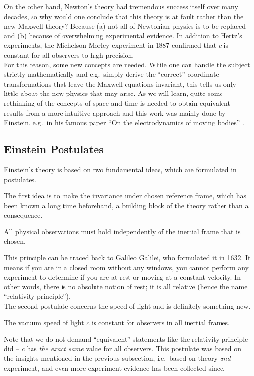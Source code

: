 On the other hand, Newton's theory had tremendous success itself over many decades, so why would one conclude that this theory is at fault rather than the new Maxwell theory? Because (a) not all of Newtonian physics is to be replaced and (b) because of overwhelming experimental evidence. In addition to Hertz's experiments, the Michelson-Morley experiment in 1887 confirmed that $c$ is constant for all observers to high precision.\\


For this reason, some new concepts are needed. While one can handle the subject strictly mathematically and e.g.~simply derive the \enquote{correct} coordinate transformations that leave the Maxwell equations invariant, this tells us only little about the new physics that may arise. As we will learn, quite some rethinking of the concepts of space and time is needed to obtain equivalent results from a more intuitive approach and this work was mainly done by Einstein, e.g.~in his famous paper \enquote{On the electrodynamics of moving bodies} \cite{Einstein_1905}.



		\subsection{Einstein Postulates}
Einstein's theory is based on two fundamental ideas, which are formulated in postulates.

The first idea is to make the invariance under chosen reference frame, which has been known a long time beforehand, a building block of the theory rather than a consequence.
\begin{post}
	All physical observations must hold independently of the inertial frame that is chosen.
\end{post}
This principle can be traced back to Galileo Galilei, who formulated it in 1632. It means if you are in a closed room without any windows, you cannot perform any experiment to determine if you are at rest or moving at a constant velocity. In other words, there is no absolute notion of rest; it is all relative (hence the name \enquote{relativity principle}).\\


The second postulate concerns the speed of light and is definitely something new.
\begin{post}\label{post:c_constant}
	The vacuum speed of light $c$ is constant for observers in all inertial frames.
\end{post}
Note that we do not demand \enquote{equivalent} statements like the relativity principle did -- $c$ has \emph{the exact same} value for all observers. This postulate was based on the insights mentioned in the previous subsection, i.e.~based on theory \emph{and} experiment, and even more experiment evidence has been collected since.

